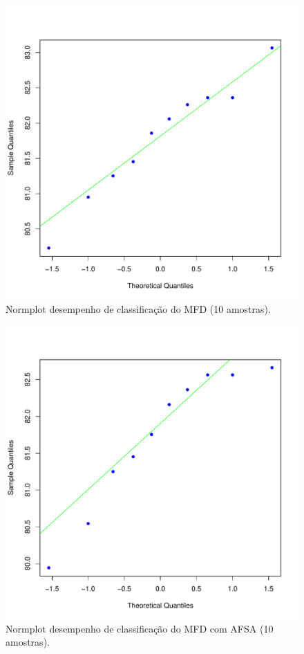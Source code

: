 \documentclass[conference]{IEEEtran}
\begin{document}
\begin{figure}[h]
	\centering
	\includegraphics[width=\linewidth]{img/bluenorm_mfd.pdf}
	\caption{Normplot desempenho de classificação do MFD (10 amostras).}
	\label{fig:norm_mfd}
\end{figure}

\begin{figure}[h]
	\centering
	\includegraphics[width=\linewidth]{img/bluenorm_afsa_mfd.pdf}
	\caption{Normplot desempenho de classificação do MFD com AFSA (10 amostras).}
	\label{fig:norm_afas_mfd}
\end{figure}
\end{document}
